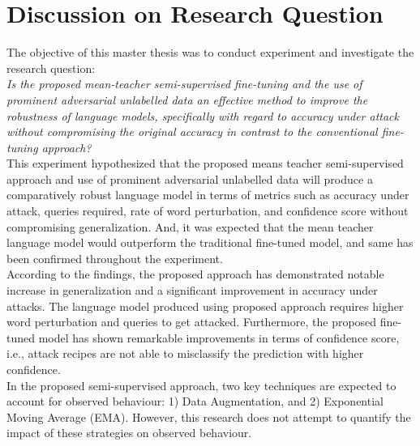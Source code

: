 \documentclass[%
	BCOR=8mm, %
	DIV=12,
	toc=bibliography, %
	toc=listof, %
	oneside, %
	egregdoesnotlikesansseriftitles, %
	]{scrbook}
\begin{document}
\section{Discussion on Research Question}
The objective of this master thesis was to conduct experiment and investigate the research question: \\
\emph{Is the proposed mean-teacher semi-supervised fine-tuning and the use of prominent adversarial unlabelled data an effective method to improve the robustness of language models, specifically with regard to accuracy under attack without compromising the original accuracy in contrast to the conventional fine-tuning approach?}\\
This experiment hypothesized that the proposed means teacher semi-supervised approach and use of prominent adversarial unlabelled data will produce a comparatively robust language model in terms of metrics such as accuracy under attack, queries required, rate of word perturbation, and confidence score without compromising generalization. And, it  was expected that the mean teacher language model would outperform the traditional fine-tuned model, and same has been confirmed throughout the experiment.\\
According to the findings, the proposed approach has demonstrated notable increase in generalization and a significant improvement in accuracy under attacks. The language model produced using proposed approach requires higher word perturbation and queries to get attacked. Furthermore, the proposed fine-tuned model has shown remarkable improvements in terms of confidence score, i.e., attack recipes are not able to misclassify the prediction with higher confidence.\\
In the proposed semi-supervised approach, two key techniques are expected to account for observed behaviour: 1) Data Augmentation, and 2) Exponential Moving Average (EMA). However, this research does not attempt to quantify the impact of these strategies on observed behaviour. 
\end{document}
